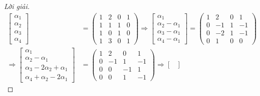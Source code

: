 \begin{proof}[Lời giải]
    \begin{align*}
        \begin{bmatrix}
            \alpha_{1} \\
            \alpha_{2} \\
            \alpha_{3} \\
            \alpha_{4}
        \end{bmatrix}                          & =
        \begin{pmatrix}
            1 & 2 & 0 & 1 \\
            1 & 1 & 1 & 0 \\
            1 & 0 & 1 & 0 \\
            1 & 3 & 0 & 1
        \end{pmatrix}
        \Longrightarrow
        \begin{bmatrix}
            \alpha_{1}              \\
            \alpha_{2} - \alpha_{1} \\
            \alpha_{3} - \alpha_{1} \\
            \alpha_{4} - \alpha_{1}
        \end{bmatrix}=
        \begin{pmatrix}
            1 & 2  & 0 & 1  \\
            0 & -1 & 1 & -1 \\
            0 & -2 & 1 & -1 \\
            0 & 1  & 0 & 0
        \end{pmatrix}                            \\
        \Longrightarrow
        \begin{bmatrix}
            \alpha_{1}                            \\
            \alpha_{2} - \alpha_{1}               \\
            \alpha_{3} - 2\alpha_{2} + \alpha_{1} \\
            \alpha_{4} + \alpha_{2} - 2\alpha_{1}
        \end{bmatrix} & =
        \begin{pmatrix}
            1 & 2  & 0  & 1  \\
            0 & -1 & 1  & -1 \\
            0 & 0  & -1 & 1  \\
            0 & 0  & 1  & -1
        \end{pmatrix}
        \Longrightarrow
        \begin{bmatrix}

\end{bmatrix}
\end{align*}
\end{proof}
